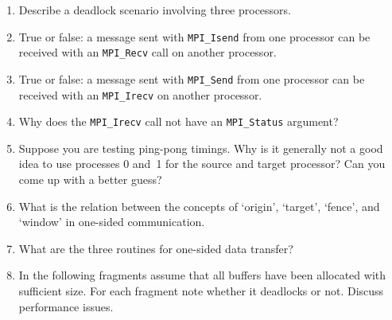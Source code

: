 \begin{enumerate}
\item Describe a deadlock scenario involving three processors.

\item True or false: a message sent with \lstinline{MPI_Isend} from one processor can be
  received with an \lstinline{MPI_Recv} call on another processor.

\item True or false: a message sent with \lstinline{MPI_Send} from one processor can be
  received with an \lstinline{MPI_Irecv} on another processor.

\item Why does the \lstinline{MPI_Irecv} call not have an \lstinline{MPI_Status} argument?

\item
  Suppose you are testing ping-pong timings.
  Why is it generally not a good idea to use processes 0 and~1 for the
  source and target processor?  Can you come up with a better guess?

\item What is the relation between the concepts of `origin', `target', `fence',
  and `window' in one-sided communication.

\item What are the three routines for one-sided data transfer?

\lstset{
  style=reviewcode,
  language=C,
}

\item In the following fragments %
  assume that all buffers have been
  allocated with sufficient size. For each fragment note whether it
  deadlocks or not. Discuss performance issues.


\end{enumerate}
